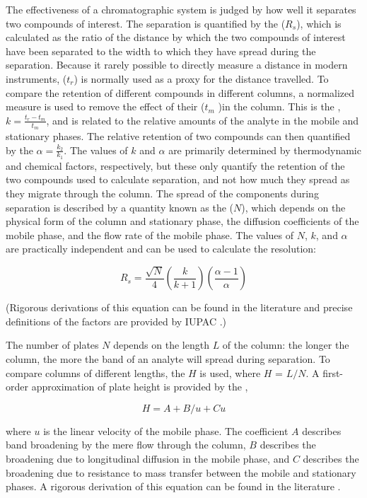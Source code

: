 The effectiveness of a chromatographic system is judged by how well it separates
two compounds of interest. The separation is quantified by the
 (\(R_s\)), which is calculated as the ratio of the distance
by which the two compounds of interest have been separated to the width to which
they have spread during the separation. Because it rarely possible to directly
measure a distance in modern instruments,  (\(t_r\)) is
normally used as a proxy for the distance travelled. To compare the retention of
different compounds in different columns, a normalized measure is used to remove
the effect of their  (\(t_m\) )in the column. This is the
, \(k = \frac{t_r-t_m}{t_m}\), and is related to the
relative amounts of the analyte in the mobile and stationary phases. The
relative retention of two compounds can then quantified by the
 \(\alpha = \frac{k_2}{k_1} \). The values of \(k\)
and \(\alpha\) are primarily determined by thermodynamic and chemical factors,
respectively, but these only quantify the retention of the two compounds used to
calculate separation, and not how much they spread as they migrate through the
column. The spread of the components during separation is described by a
quantity known as the  (\(N\)), which depends on the
physical form of the column and stationary phase, the diffusion coefficients of
the mobile phase, and the flow rate of the mobile phase. The values of \(N\),
\(k\), and \(\alpha\) are practically independent and can be used to calculate
the resolution:
 
\[ {R_s} = \frac{\sqrt{N}}{4}\left(\frac{k}{k+1}\right)\left(\frac{\alpha - 1}{\alpha}\right) \]

(Rigorous derivations of this equation can be found in the literature
\autocite{Sandra1989a} and precise definitions of the factors are
provided by IUPAC \autocite{Ettre1993b}.)

The number of plates \(N\) depends on the length \(L\) of the column: the longer
the column, the more the band of an analyte will spread during separation. To
compare columns of different lengths, the  \(H\) is used,
where \(H\) = \(L / N \). A first-order approximation of plate height is
provided by the ,

\[ H = A + B/u + C u \] 

where \(u\) is the linear velocity of the mobile phase. The coefficient \(A\)
describes band broadening by the mere flow through the column, \(B\) describes
the broadening due to longitudinal diffusion in the mobile phase, and \(C\)
describes the broadening due to resistance to mass transfer between the mobile
and stationary phases. A rigorous derivation of this equation can be found in
the literature  \autocite{Sandra1989}.

